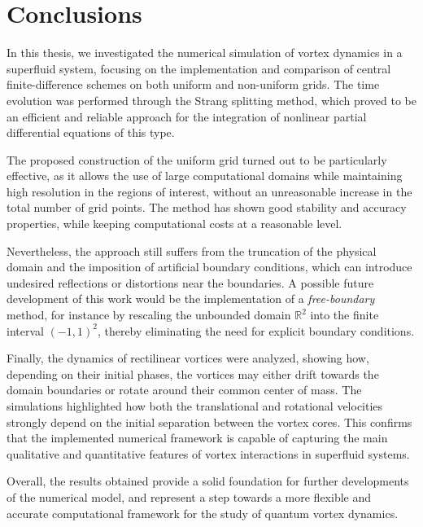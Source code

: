 \chapter{Conclusions}

In this thesis, we investigated the numerical simulation of vortex dynamics in a superfluid system, focusing on the implementation and comparison of central finite-difference schemes on both uniform and non-uniform grids. The time evolution was performed through the Strang splitting method, which proved to be an efficient and reliable approach for the integration of nonlinear partial differential equations of this type.

\medskip

The proposed construction of the uniform grid turned out to be particularly effective, as it allows the use of large computational domains while maintaining high resolution in the regions of interest, without an unreasonable increase in the total number of grid points. The method has shown good stability and accuracy properties, while keeping computational costs at a reasonable level.

\medskip

Nevertheless, the approach still suffers from the truncation of the physical domain and the imposition of artificial boundary conditions, which can introduce undesired reflections or distortions near the boundaries. A possible future development of this work would be the implementation of a \emph{free-boundary} method, for instance by rescaling the unbounded domain $\mathbb{R}^2$ into the finite interval $(-1,1)^2$, thereby eliminating the need for explicit boundary conditions.

\medskip

Finally, the dynamics of rectilinear vortices were analyzed, showing how, depending on their initial phases, the vortices may either drift towards the domain boundaries or rotate around their common center of mass. The simulations highlighted how both the translational and rotational velocities strongly depend on the initial separation between the vortex cores. This confirms that the implemented numerical framework is capable of capturing the main qualitative and quantitative features of vortex interactions in superfluid systems.

\medskip

Overall, the results obtained provide a solid foundation for further developments of the numerical model, and represent a step towards a more flexible and accurate computational framework for the study of quantum vortex dynamics.